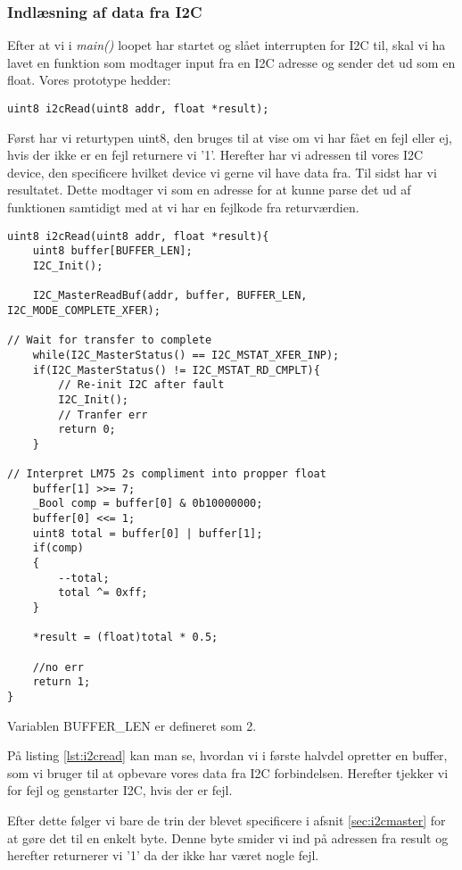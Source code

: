 \documentclass[../main.tex]{subfiles}
\begin{document}
\subsubsection{Indlæsning af data fra I2C}
Efter at vi i \textit{main()} loopet har startet og slået interrupten for I2C til, skal vi ha lavet en funktion som modtager input fra en I2C adresse og sender det ud som en float.
Vores prototype hedder:
\begin{lstlisting}
uint8 i2cRead(uint8 addr, float *result);
\end{lstlisting}
Først har vi returtypen uint8, den bruges til at vise om vi har fået en fejl eller ej, hvis der ikke er en fejl returnere vi '1'.
Herefter har vi adressen til vores I2C device, den specificere hvilket device vi gerne vil have data fra.
Til sidst har vi resultatet. Dette modtager vi som en adresse for at kunne parse det ud af funktionen samtidigt med at vi har en fejlkode fra returværdien.

\begin{lstlisting}[caption={i2cRead()}, label=lst:i2cread]
uint8 i2cRead(uint8 addr, float *result){
    uint8 buffer[BUFFER_LEN];
    I2C_Init();
    
    I2C_MasterReadBuf(addr, buffer, BUFFER_LEN, I2C_MODE_COMPLETE_XFER);
        
// Wait for transfer to complete
    while(I2C_MasterStatus() == I2C_MSTAT_XFER_INP);
    if(I2C_MasterStatus() != I2C_MSTAT_RD_CMPLT){
        // Re-init I2C after fault
        I2C_Init();
        // Tranfer err
        return 0;
    }
    
// Interpret LM75 2s compliment into propper float
    buffer[1] >>= 7;
    _Bool comp = buffer[0] & 0b10000000;
    buffer[0] <<= 1;
    uint8 total = buffer[0] | buffer[1]; 
    if(comp)
    {
        --total;
        total ^= 0xff;
    }
    
    *result = (float)total * 0.5;
    
    //no err
    return 1;
}
\end{lstlisting}
Variablen BUFFER\_LEN er defineret som 2.

På listing \ref{lst:i2cread} kan man se, hvordan vi i første halvdel opretter en buffer, som vi bruger til at opbevare vores data fra I2C forbindelsen. Herefter tjekker vi for fejl og genstarter I2C, hvis der er fejl.

Efter dette følger vi bare de trin der blevet specificere i afsnit \ref{sec:i2cmaster} for at gøre det til en enkelt byte. Denne byte smider vi ind på adressen fra result og herefter returnerer vi '1' da der ikke har været nogle fejl.
\end{document}
